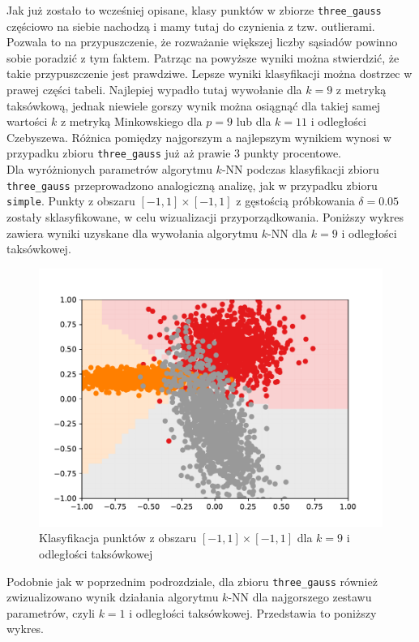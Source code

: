 \documentclass[11pt,a4paper]{article}
\begin{document}
Jak już zostało to wcześniej opisane, klasy punktów w zbiorze {\tt three\_gauss} częściowo na siebie nachodzą i mamy tutaj do czynienia z tzw. outlierami. %
Pozwala to na przypuszczenie, że rozważanie większej liczby sąsiadów powinno sobie poradzić z tym faktem. Patrząc na powyższe wyniki można stwierdzić, że takie przypuszczenie jest prawdziwe. Lepsze wyniki klasyfikacji można dostrzec w prawej części tabeli. Najlepiej wypadło tutaj wywołanie dla $k=9$ z metryką taksówkową, jednak niewiele gorszy wynik można osiągnąć dla takiej samej wartości $k$ z metryką Minkowskiego dla $p=9$ lub dla $k=11$ i odległości Czebyszewa. Różnica pomiędzy najgorszym a najlepszym wynikiem wynosi w przypadku zbioru {\tt three\_gauss} już aż prawie 3 punkty procentowe.\\ %

Dla wyróżnionych parametrów algorytmu $k$-NN podczas klasyfikacji zbioru {\tt three\_gauss} przeprowadzono analogiczną analizę, jak w przypadku zbioru {\tt simple}. Punkty z obszaru $[-1,1] \times [-1,1]$ z gęstością próbkowania $\delta = 0.05$ zostały sklasyfikowane, w celu wizualizacji przyporządkowania. Poniższy wykres zawiera wyniki uzyskane dla wywołania algorytmu $k$-NN dla $k=9$ i odległości taksówkowej.

\begin{figure}[H]
  \centering
  \includegraphics[width=.8\textwidth]{res/gauss-manhattan-9.pdf}
  \caption{Klasyfikacja punktów z obszaru $[-1,1] \times [-1,1]$ dla $k = 9$ i odległości taksówkowej}
  \label{fig:gauss-manhattan-9}
\end{figure}

Podobnie jak w poprzednim podrozdziale, dla zbioru {\tt three\_gauss} również zwizualizowano wynik działania algorytmu $k$-NN dla najgorszego zestawu parametrów, czyli $k=1$ i odległości taksówkowej. Przedstawia to poniższy wykres.
\end{document}
